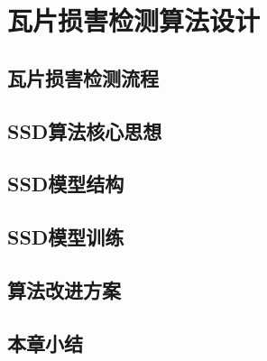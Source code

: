 \section{瓦片损害检测算法设计}
\setcounter{figure}{0}

\subsection{瓦片损害检测流程}
\subsection{SSD算法核心思想}
\subsection{SSD模型结构}
\subsection{SSD模型训练}
\subsection{算法改进方案}
\subsection{本章小结}